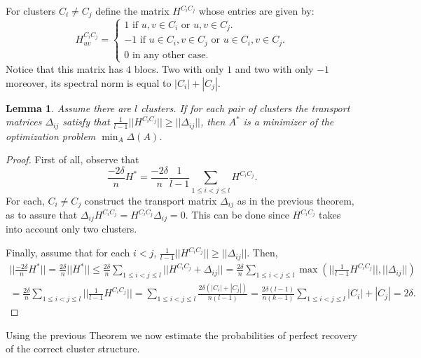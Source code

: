 \documentclass[12pt]{amsart}
\newtheorem{lemma}{Lemma}[section]
\theoremstyle{remark}
\begin{document}
For  clusters $C_i\neq C_j$ define the matrix $H^{C_iC_j}$ whose entries are given by: 
\[
H^{C_iC_j}_{uv}= 
\begin{cases}
1 \text{ if } u,v \in C_i \text{ or } u,v \in C_j. \\
-1 \text{ if } u \in C_i, v \in C_j \text{ or } u \in C_i, v\in C_j. \\
0 \text{ in any other case.}
\end{cases}
\]
Notice that this matrix has $4$ blocs. Two with only $1$ and two with only $-1$ moreover, its spectral norm is equal to $|C_i|+|C_j|$.

\begin{lemma}
Assume there are $l$ clusters. If for each pair of clusters the transport matrices $\Delta_{ij}$ satisfy that $\frac{1}{l-1}||H^{C_iC_j}||\geq ||\Delta_{ij}||$, then
$A^*$ is a minimizer of the optimization problem $\min_A\Delta(A)$. 
\end{lemma}

\begin{proof}

First of all, observe that
\[
\frac{-2\delta}{n}H^* = \frac{-2\delta}{n}\frac{1}{l-1}\sum_{1\leq i<j\leq l}H^{C_iC_j}.
\]
For each, $C_i\neq C_j$ construct the transport matrix $\Delta_{ij}$ as in the previous theorem, as to assure that $\Delta_{ij}H^{C_iC_j} = H^{C_iC_j} \Delta_{ij}=0$. This can be done since $H^{C_iC_j}$ takes into account only two clusters. 

Finally, assume that for each $i<j$, $\frac{1}{l-1}||H^{C_iC_j}||\geq ||\Delta_{ij}||$.
Then,
\[
\begin{aligned}
||\frac{-2\delta}{n}H^*|| = \frac{2\delta}{n}||H^*|| \leq \frac{2\delta}{n}\sum_{1\leq i<j\leq l}||H^{C_iC_j}+\Delta_{ij}|| = \frac{2\delta}{n}\sum_{1\leq i<j\leq l} \max (||\frac{1}{l-1}H^{C_iC_j}||,||\Delta_{ij}||)& \\
= \frac{2\delta}{n}\sum_{1\leq i<j\leq l} ||\frac{1}{l-1}H^{C_iC_j}|| = \sum_{1\leq i<j\leq l} \frac{2\delta(|C_i|+|C_j|)}{n(l-1)} = \frac{2\delta(l-1)}{n(k-1)}\sum_{1\leq i<j\leq l}|C_i|+|C_j|=2\delta.
\end{aligned}
\]


\end{proof}







Using the previous Theorem we now estimate the probabilities of perfect recovery of the correct cluster structure. 
\end{document}
